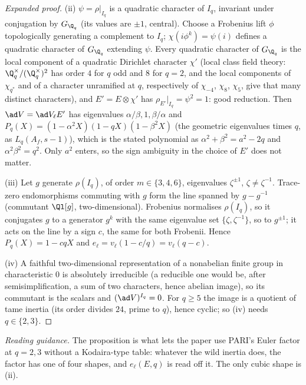 \begin{sloppypar}
\begin{proof}[Expanded proof]
(ii) $\psi=\rho|_{I_q}$ is a quadratic character of $I_q$, invariant under conjugation by $G_{\Q_q}$ (its values are $\pm1$, central). Choose a Frobenius lift $\phi$ topologically
generating a complement to $I_q$; $\chi(i\phi^k)=\psi(i)$ defines a quadratic character of $G_{\Q_q}$ extending $\psi$. Every quadratic character of $G_{\Q_q}$ is the local component of a
quadratic Dirichlet character $\chi'$ (local class field theory: $\Q_q^\times/(\Q_q^\times)^2$ has order $4$ for $q$ odd and $8$ for $q=2$, and the local components of $\chi_{q^*}$ and of a character
unramified at $q$, respectively of $\chi_{-4}$, $\chi_8$, $\chi_5$, give that many distinct characters), and $E'=E\otimes\chi'$ has $\rho_{E'}|_{I_q}=\psi^2=1$: good reduction. Then $\ad V=\ad V_\ell E'$ has eigenvalues
$\alpha/\beta,1,\beta/\alpha$ and $P_q(X)=(1-\alpha^2X)(1-qX)(1-\beta^2X)$ (the geometric eigenvalues times $q$, as $L_q(A_f,s-1)$), which is the stated polynomial as
$\alpha^2+\beta^2=a^2-2q$ and $\alpha^2\beta^2=q^2$. Only $a^2$ enters, so the sign ambiguity in the choice of $E'$ does not matter.

(iii) Let $g$ generate $\rho(I_q)$, of order $m\in\{3,4,6\}$, eigenvalues $\zeta^{\pm1}$, $\zeta\ne\zeta^{-1}$. Trace-zero endomorphisms commuting with $g$ form the line spanned by $g-g^{-1}$
(commutant $\Ql[g]$, two-dimensional). Frobenius normalises $\rho(I_q)$, so it conjugates $g$ to a generator $g^k$ with the same eigenvalue set $\{\zeta,\zeta^{-1}\}$, so to $g^{\pm1}$; it acts on
the line by a sign $c$, the same for both Frobenii. Hence $P_q(X)=1-cqX$ and $e_\ell=v_\ell(1-c/q)=v_\ell(q-c)$.

(iv) A faithful two-dimensional representation of a nonabelian finite group in characteristic $0$ is absolutely irreducible (a reducible one would be, after
semisimplification, a sum of two characters, hence abelian image), so its commutant is the scalars and $(\ad V)^{I_q}=0$. For $q\ge5$ the image is a quotient of tame
inertia (its order divides $24$, prime to $q$), hence cyclic; so (iv) needs $q\in\{2,3\}$.
\end{proof}

\noindent\emph{Reading guidance.} The proposition is what lets the paper use PARI's Euler factor at $q=2,3$ without a Kodaira-type table: whatever the wild inertia does, the
factor has one of four shapes, and $e_\ell(E,q)$ is read off it. The only cubic shape is (ii).


\end{sloppypar}

